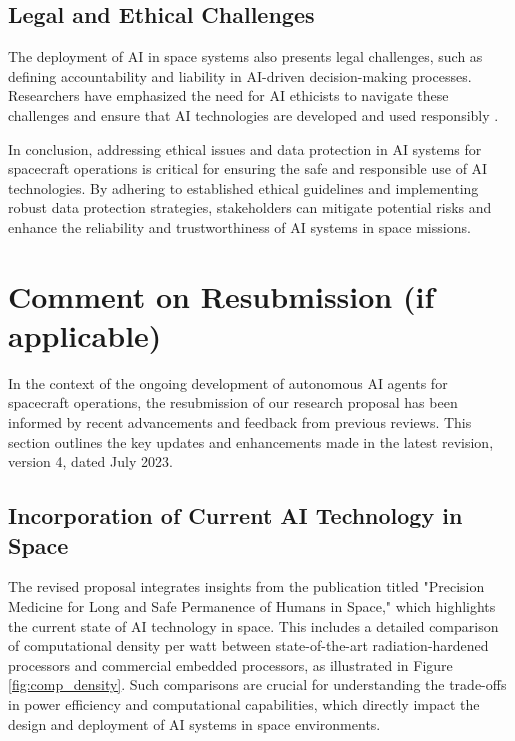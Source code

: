 \documentclass[a4paper, 11pt]{article}
\begin{document}
\subsection{Legal and Ethical Challenges}

The deployment of AI in space systems also presents legal challenges, such as defining accountability and liability in AI-driven decision-making processes. Researchers have emphasized the need for AI ethicists to navigate these challenges and ensure that AI technologies are developed and used responsibly \cite{pavaloiu_ethical_ai}.

In conclusion, addressing ethical issues and data protection in AI systems for spacecraft operations is critical for ensuring the safe and responsible use of AI technologies. By adhering to established ethical guidelines and implementing robust data protection strategies, stakeholders can mitigate potential risks and enhance the reliability and trustworthiness of AI systems in space missions.



\section{Comment on Resubmission (if applicable)}

In the context of the ongoing development of autonomous AI agents for spacecraft operations, the resubmission of our research proposal has been informed by recent advancements and feedback from previous reviews. This section outlines the key updates and enhancements made in the latest revision, version 4, dated July 2023.

\subsection{Incorporation of Current AI Technology in Space}

The revised proposal integrates insights from the publication titled "Precision Medicine for Long and Safe Permanence of Humans in Space," which highlights the current state of AI technology in space. This includes a detailed comparison of computational density per watt between state-of-the-art radiation-hardened processors and commercial embedded processors, as illustrated in Figure \ref{fig:comp_density}. Such comparisons are crucial for understanding the trade-offs in power efficiency and computational capabilities, which directly impact the design and deployment of AI systems in space environments.
\end{document}
